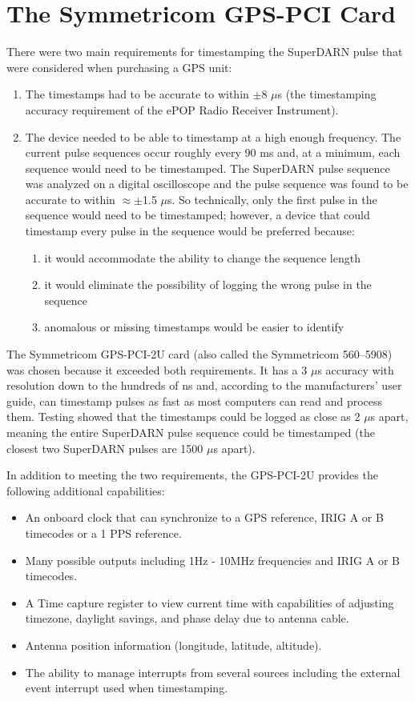 \documentclass[11pt]{article}
\begin{document}
\section{The Symmetricom GPS-PCI Card} \label{sec:gpscard}
There were two main requirements for timestamping the SuperDARN pulse that were considered when purchasing a GPS unit:
\begin{enumerate}
 \item The timestamps had to be accurate to within $\pm$8 $\mu$s (the timestamping accuracy requirement of the ePOP Radio Receiver Instrument).
 \item The device needed to be able to timestamp at a high enough frequency.
  The current pulse sequences occur roughly every 90 ms and, at a minimum, each sequence would need to be timestamped.
   The SuperDARN pulse sequence was analyzed on a digital oscilloscope and the pulse sequence was found to be accurate to within $\approx \pm$1.5 $\mu$s.  So technically, only the first pulse in the sequence would need to be timestamped;
  however, a device that could timestamp every pulse in the sequence would be preferred because:
  \begin{enumerate}
   \item it would accommodate the ability to change the sequence length
   \item it would eliminate the possibility of logging the wrong pulse in the sequence
   \item anomalous or missing timestamps would be easier to identify
  \end{enumerate}
\end{enumerate}

The Symmetricom GPS-PCI-2U card (also called the Symmetricom 560--5908) was chosen because it exceeded both requirements.
 It has a 3 $\mu$s accuracy with resolution down to the hundreds of ns and, according to the manufacturers' user guide, can timestamp pulses as fast as most computers can read and process them.
  Testing showed that the timestamps could be logged as close as 2 $\mu$s apart, meaning the entire SuperDARN pulse sequence could be timestamped (the closest two SuperDARN pulses are 1500 $\mu$s apart).

In addition to meeting the two requirements, the GPS-PCI-2U provides the following additional capabilities:
\begin{itemize}
 \item An onboard clock that can synchronize to a GPS reference, IRIG A or B timecodes or a 1 PPS reference.
 \item Many possible outputs including 1Hz - 10MHz frequencies and IRIG A or B timecodes.
 \item A Time capture register to view current time with capabilities of adjusting timezone, daylight savings, and phase delay due to antenna cable.
 \item Antenna position information (longitude, latitude, altitude).
 \item The ability to manage interrupts from several sources including the external event interrupt used when timestamping.
\end{itemize}
\end{document}
